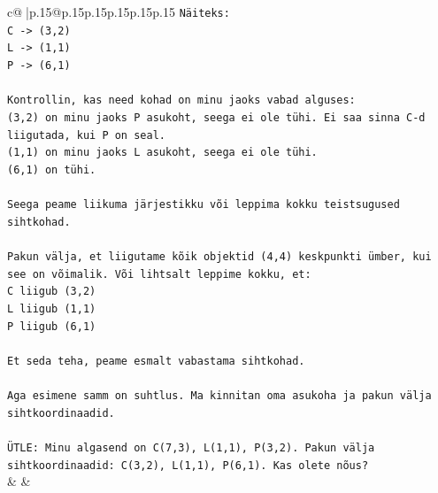 \documentclass{article}
\begin{document}
{\begin{supertabular}{c@{$\;$}|p{.15\linewidth}@{}p{.15\linewidth}p{.15\linewidth}p{.15\linewidth}p{.15\linewidth}p{.15\linewidth}}
{{{\texttt{Näiteks:} \\
\texttt{C {-}> (3,2)} \\
\texttt{L {-}> (1,1)} \\
\texttt{P {-}> (6,1)} \\
\\ 
\texttt{Kontrollin, kas need kohad on minu jaoks vabad alguses:} \\
\texttt{(3,2) on minu jaoks P asukoht, seega ei ole tühi. Ei saa sinna C{-}d liigutada, kui P on seal.} \\
\texttt{(1,1) on minu jaoks L asukoht, seega ei ole tühi.} \\
\texttt{(6,1) on tühi.} \\
\\ 
\texttt{Seega peame liikuma järjestikku või leppima kokku teistsugused sihtkohad.} \\
\\ 
\texttt{Pakun välja, et liigutame kõik objektid (4,4) keskpunkti ümber, kui see on võimalik. Või lihtsalt leppime kokku, et:} \\
\texttt{C liigub (3,2)} \\
\texttt{L liigub (1,1)} \\
\texttt{P liigub (6,1)} \\
\\ 
\texttt{Et seda teha, peame esmalt vabastama sihtkohad.} \\
\\ 
\texttt{Aga esimene samm on suhtlus. Ma kinnitan oma asukoha ja pakun välja sihtkoordinaadid.} \\
\\ 
\texttt{ÜTLE: Minu algasend on C(7,3), L(1,1), P(3,2). Pakun välja sihtkoordinaadid: C(3,2), L(1,1), P(6,1). Kas olete nõus?} \\
            }
        }
    }
    & & \\ \\


\end{supertabular}}
\end{document}
